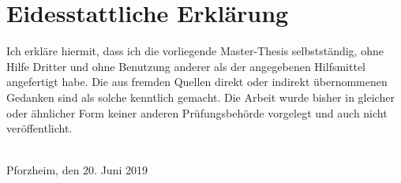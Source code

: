
\section*{Eidesstattliche Erklärung} \label{declaration}

Ich erkläre hiermit, dass ich die vorliegende Master-Thesis
selbstständig, ohne Hilfe Dritter und ohne Benutzung anderer 
als der angegebenen Hilfsmittel angefertigt habe. 
Die aus fremden Quellen direkt oder indirekt übernommenen Gedanken 
sind als solche kenntlich gemacht. 
Die Arbeit wurde bisher in gleicher oder ähnlicher Form keiner anderen
Prüfungsbehörde vorgelegt und auch nicht veröffentlicht.


\vspace{3cm} \ \\
Pforzheim, den 20. Juni 2019
